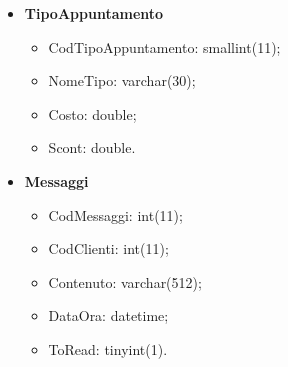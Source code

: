 {\begin{itemize}
\begin{itemize}
			\item PRivendita: double.
		\end{itemize}
		\item \textbf{TipoAppuntamento}
		\begin{itemize}\itemsep1pt
			\item CodTipoAppuntamento: smallint(11);
			\item NomeTipo:	varchar(30);
			\item Costo: double;
			\item Scont: double.
		\end{itemize}
		\item \textbf{Messaggi}
		\begin{itemize}
			\item CodMessaggi: int(11);
			\item CodClienti: int(11);
			\item Contenuto: varchar(512);
			\item DataOra: datetime;
			\item ToRead: tinyint(1).
		\end{itemize}
	\end{itemize}
}